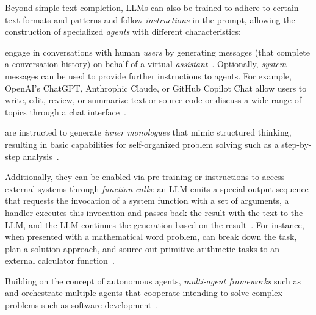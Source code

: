 Beyond simple text completion, LLMs can also be trained to adhere to certain text formats and patterns and follow \emph{instructions} in the prompt, allowing the construction of specialized \emph{agents} with different characteristics:
%
\begin{description}[noextralabelsep]
	\item[Conversational agents] engage in conversations with human \emph{users} by generating messages (that complete a conversation history) on behalf of a virtual \emph{assistant}~\cite{bai2022training}.
	Optionally, \emph{system} messages can be used to provide further instructions to agents.
	For example, OpenAI's ChatGPT, Anthrophic Claude, or GitHub Copilot Chat allow users to write, edit, review, or summarize text or source code or discuss a wide range of topics through a chat interface~\cite{openai2024gpt4}.

	\item[Autonomous agents] are instructed to generate \emph{inner monologues} that mimic structured thinking, resulting in basic capabilities for self-organized problem solving such as a step-by-step analysis~\cite{yang2023autogpt}.

	Additionally, they can be enabled via pre-training or instructions to access external systems through \emph{function calls}: an LLM emits a special output sequence that requests the invocation of a system function with a set of arguments, a handler executes this invocation and passes back the result with the text to the LLM, and the LLM continues the generation based on the result~\cite{hao2023toolkengpt,mialon2023augmented,yang2023autogpt}.
	For instance, when presented with a mathematical word problem, \gptfouro can break down the task, plan a solution approach, and source out primitive arithmetic tasks to an external calculator function~\cite{openai2024gpt4}.

	Building on the concept of autonomous agents, \emph{multi-agent frameworks} such as  and  orchestrate multiple agents that cooperate intending to solve complex problems such as software development~\cite{hong2023metagpt,qian2023communicative}.
\end{description}

